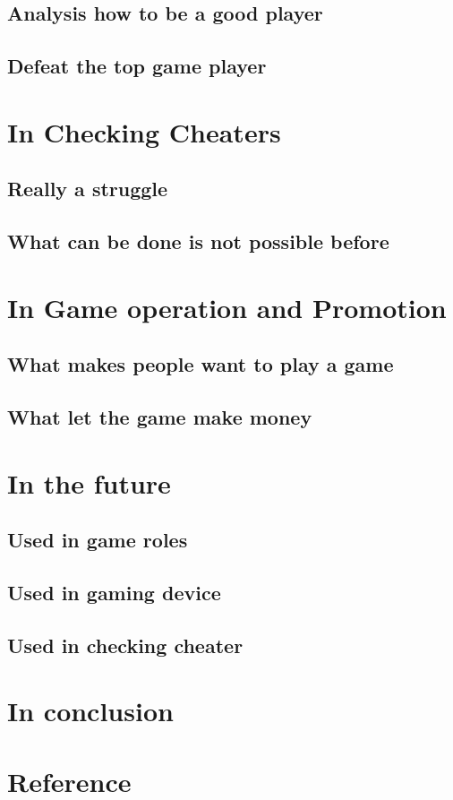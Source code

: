 \documentclass[12pt]{article}
\begin{document}
        \subsection{Analysis how to be a good player}
        \subsection{Defeat the top game player}
    \section{In Checking Cheaters}
        \subsection{Really a struggle}
        \subsection{What can be done is not possible before}
    \section{In Game operation and Promotion}
        \subsection{What makes people want to play a game}
        \subsection{What let the game make money}
    \section{In the future}
        \subsection{Used in game roles}
        \subsection{Used in gaming device}
        \subsection{Used in checking cheater}
    \section{In conclusion}
    \pagebreak
    \section{Reference}
\end{document}
